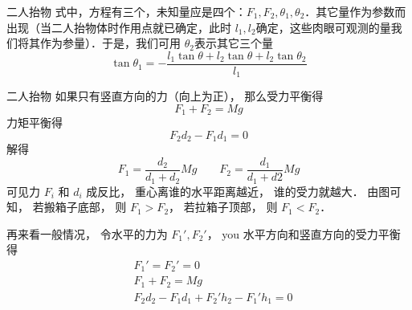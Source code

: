 \begin{example}{二人抬物}
式中，方程有三个，未知量应是四个：$F_1,F_2,\theta_1,\theta_2$．其它量作为参数而出现（当二人抬物体时作用点就已确定，此时 $l_1,l_2$确定，这些肉眼可观测的量我们将其作为参量）．于是，我们可用 $\theta_2$表示其它三个量
\begin{equation}
\tan\theta_1=-\frac {l_1
 \tan  \theta +l_2\tan\theta +l_2\tan
\theta_2}{l_1}
\end{equation}
\end{example}

\begin{example}{二人抬物}
如果只有竖直方向的力（向上为正）， 那么受力平衡得
\begin{equation}
F_1 + F_2 = Mg
\end{equation}
力矩平衡得
\begin{equation}
F_2 d_2 - F_1 d_1 = 0
\end{equation}
解得
\begin{equation}
F_1 = \frac{d_2}{d_1 + d_2}Mg \qquad F_2 = \frac{d_1}{d_1 + d2}Mg
\end{equation}
可见力 $F_i$ 和 $d_i$ 成反比， 重心离谁的水平距离越近， 谁的受力就越大． 由图可知， 若搬箱子底部， 则 $F_1 > F_2$， 若拉箱子顶部， 则 $F_1 < F_2$．

再来看一般情况， 令水平的力为 $F_1', F_2'$， you 水平方向和竖直方向的受力平衡得
\begin{equation}
\begin{aligned}
&F_1' = F_2' = 0\\
&F_1 + F_2 = Mg\\
&F_2 d_2 - F_1 d_1 + F_2' h_2 - F_1' h_1 = 0
\end{aligned}
\end{equation}
\end{example}
